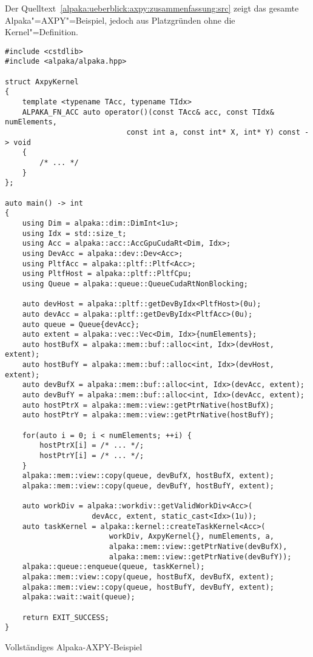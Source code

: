 Der Quelltext~\ref{alpaka:ueberblick:axpy:zusammenfassung:src} zeigt das gesamte
Alpaka"=AXPY"=Beispiel, jedoch aus Platzgründen ohne die Kernel"=Definition.

\begin{code}
    \begin{verbatim}
#include <cstdlib>
#include <alpaka/alpaka.hpp>

struct AxpyKernel
{
    template <typename TAcc, typename TIdx>
    ALPAKA_FN_ACC auto operator()(const TAcc& acc, const TIdx& numElements,
                            const int a, const int* X, int* Y) const -> void
    {
        /* ... */
    }
};

auto main() -> int
{
    using Dim = alpaka::dim::DimInt<1u>;
    using Idx = std::size_t;
    using Acc = alpaka::acc::AccGpuCudaRt<Dim, Idx>;
    using DevAcc = alpaka::dev::Dev<Acc>;
    using PltfAcc = alpaka::pltf::Pltf<Acc>;
    using PltfHost = alpaka::pltf::PltfCpu;
    using Queue = alpaka::queue::QueueCudaRtNonBlocking;

    auto devHost = alpaka::pltf::getDevByIdx<PltfHost>(0u);
    auto devAcc = alpaka::pltf::getDevByIdx<PltfAcc>(0u);
    auto queue = Queue{devAcc};
    auto extent = alpaka::vec::Vec<Dim, Idx>{numElements};
    auto hostBufX = alpaka::mem::buf::alloc<int, Idx>(devHost, extent);
    auto hostBufY = alpaka::mem::buf::alloc<int, Idx>(devHost, extent);
    auto devBufX = alpaka::mem::buf::alloc<int, Idx>(devAcc, extent);
    auto devBufY = alpaka::mem::buf::alloc<int, Idx>(devAcc, extent);
    auto hostPtrX = alpaka::mem::view::getPtrNative(hostBufX);
    auto hostPtrY = alpaka::mem::view::getPtrNative(hostBufY);

    for(auto i = 0; i < numElements; ++i) {
        hostPtrX[i] = /* ... */;
        hostPtrY[i] = /* ... */;
    }
    alpaka::mem::view::copy(queue, devBufX, hostBufX, extent);
    alpaka::mem::view::copy(queue, devBufY, hostBufY, extent);

    auto workDiv = alpaka::workdiv::getValidWorkDiv<Acc>(
                    devAcc, extent, static_cast<Idx>(1u));
    auto taskKernel = alpaka::kernel::createTaskKernel<Acc>(
                        workDiv, AxpyKernel{}, numElements, a,
                        alpaka::mem::view::getPtrNative(devBufX),
                        alpaka::mem::view::getPtrNative(devBufY));
    alpaka::queue::enqueue(queue, taskKernel);
    alpaka::mem::view::copy(queue, hostBufX, devBufX, extent);
    alpaka::mem::view::copy(queue, hostBufY, devBufY, extent);
    alpaka::wait::wait(queue);

    return EXIT_SUCCESS;
}
    \end{verbatim}
    \caption{Vollständiges Alpaka-AXPY-Beispiel}
    \label{alpaka:ueberblick:axpy:zusammenfassung:src}
\end{code}

